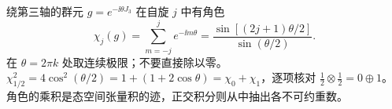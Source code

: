 \begin{workedexample}[$SU(2)$ 的角色与张量积]
绕第三轴的群元 $g=e^{-\ii\theta J_3}$ 在自旋 $j$ 中有角色
\[
 \chi_j(g)=\sum_{m=-j}^j e^{-\ii m\theta}
 =\frac{\sin[(2j+1)\theta/2]}{\sin(\theta/2)}.
\]
在 $\theta=2\pi k$ 处取连续极限；不要直接除以零。$\chi_{1/2}^2=4\cos^2(\theta/2)=1+(1+2\cos\theta)=\chi_0+\chi_1$，逐项核对 $\tfrac12\otimes\tfrac12=0\oplus1$。角色的乘积是态空间张量积的迹，正交积分则从中抽出各不可约重数。
\end{workedexample}
